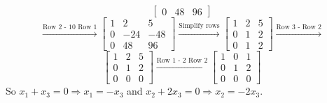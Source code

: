 \begin{enumerate}[label=(\alph*)]
\[\begin{bmatrix}
                    0 & 48 & 96
                \end{bmatrix}
            \]
            \[
                \overset{\text{Row 2 - 10 Row 1}}{\longrightarrow}
                \begin{bmatrix}
                    1 & 2 & 5 \\
                    0 & -24 & -48 \\
                    0 & 48 & 96
                \end{bmatrix}
                \overset{\text{Simplify rows}}{\longrightarrow}
                \begin{bmatrix}
                    1 & 2 & 5 \\
                    0 & 1 & 2 \\
                    0 & 1 & 2
                \end{bmatrix}
                \overset{\text{Row 3 - Row 2}}{\longrightarrow}
            \]
            \[
                \begin{bmatrix}
                    1 & 2 & 5 \\
                    0 & 1 & 2 \\
                    0 & 0 & 0
                \end{bmatrix}
                \overset{\text{Row 1 - 2 Row 2}}{\longrightarrow}
                \begin{bmatrix}
                    1 & 0 & 1 \\
                    0 & 1 & 2 \\
                    0 & 0 & 0
                \end{bmatrix}
            \]
            So $x_1 + x_3 = 0 \Rightarrow x_1 = -x_3$
            and $x_2 + 2x_3 = 0 \Rightarrow x_2 = -2x_3$.


\end{enumerate}
